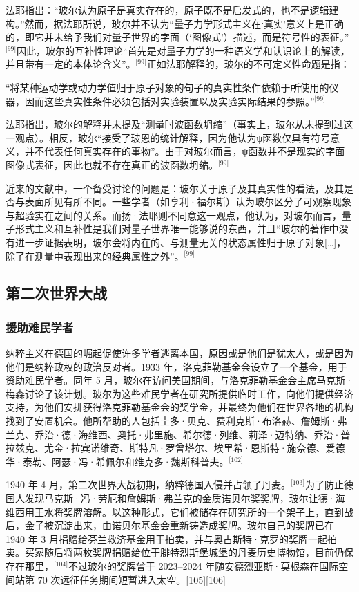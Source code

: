 法耶指出：“玻尔认为原子是真实存在的，原子既不是启发式的，也不是逻辑建构。”然而，据法耶所说，玻尔并不认为“量子力学形式主义在‘真实’意义上是正确的，即它并未给予我们对量子世界的字面（‘图像式’）描述，而是符号性的表征。”\(^\text{[99]}\)因此，玻尔的互补性理论“首先是对量子力学的一种语义学和认识论上的解读，并且带有一定的本体论含义”。\(^\text{[99]}\)正如法耶解释的，玻尔的不可定义性命题是指：

“将某种运动学或动力学值归于原子对象的句子的真实性条件依赖于所使用的仪器，因而这些真实性条件必须包括对实验装置以及实验实际结果的参照。”\(^\text{[99]}\)

法耶指出，玻尔的解释并未提及“测量时波函数坍缩”（事实上，玻尔从未提到过这一观点）。相反，玻尔“接受了玻恩的统计解释，因为他认为ψ函数仅具有符号意义，并不代表任何真实存在的事物”。由于对玻尔而言，ψ函数并不是现实的字面图像式表征，因此也就不存在真正的波函数坍缩。\(^\text{[99]}\)

近来的文献中，一个备受讨论的问题是：玻尔关于原子及其真实性的看法，及其是否与表面所见有所不同。一些学者（如亨利·福尔斯）认为玻尔区分了可观察现象与超验实在之间的关系。而扬·法耶则不同意这一观点，他认为，对玻尔而言，量子形式主义和互补性是我们对量子世界唯一能够说的东西，并且“玻尔的著作中没有进一步证据表明，玻尔会将内在的、与测量无关的状态属性归于原子对象[…]，除了在测量中表现出来的经典属性之外”。\(^\text{[99]}\)
\subsection{第二次世界大战}
\subsubsection{援助难民学者}
纳粹主义在德国的崛起促使许多学者逃离本国，原因或是他们是犹太人，或是因为他们是纳粹政权的政治反对者。1933 年，洛克菲勒基金会设立了一个基金，用于资助难民学者。同年 5 月，玻尔在访问美国期间，与洛克菲勒基金会主席马克斯·梅森讨论了该计划。玻尔为这些难民学者在研究所提供临时工作，向他们提供经济支持，为他们安排获得洛克菲勒基金会的奖学金，并最终为他们在世界各地的机构找到了安置机会。他所帮助的人包括圭多·贝克、费利克斯·布洛赫、詹姆斯·弗兰克、乔治·德·海维西、奥托·弗里施、希尔德·列维、莉泽·迈特纳、乔治·普拉兹克、尤金·拉宾诺维奇、斯特凡·罗曾塔尔、埃里希·恩斯特·施奈德、爱德华·泰勒、阿瑟·冯·希佩尔和维克多·魏斯科普夫。\(^\text{[102]}\)

1940 年 4 月，第二次世界大战初期，纳粹德国入侵并占领了丹麦。\(^\text{[103]}\)为了防止德国人发现马克斯·冯·劳厄和詹姆斯·弗兰克的金质诺贝尔奖奖牌，玻尔让德·海维西用王水将奖牌溶解。以这种形式，它们被储存在研究所的一个架子上，直到战后，金子被沉淀出来，由诺贝尔基金会重新铸造成奖牌。玻尔自己的奖牌已在 1940 年 3 月捐赠给芬兰救济基金用于拍卖，并与奥古斯特·克罗的奖牌一起拍卖。买家随后将两枚奖牌捐赠给位于腓特烈斯堡城堡的丹麦历史博物馆，目前仍保存在那里，\(^\text{[104]}\)不过玻尔的奖牌曾于 2023–2024 年随安德烈亚斯·莫根森在国际空间站第 70 次远征任务期间短暂进入太空。[105][106]

